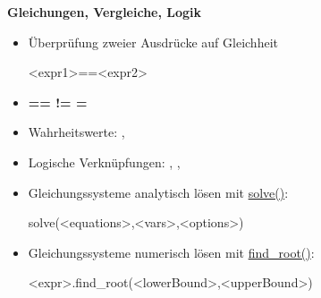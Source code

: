 \documentclass[a4paper,9pt,DIV15,twocolumn]{scrartcl}
\begin{document}
\textbf{Gleichungen, Vergleiche, Logik}

\begin{itemize}
	\item \"Uberpr\"ufung zweier Ausdr\"ucke auf Gleichheit
		\begin{sagein}
<expr1>==<expr2>
		\end{sagein}
	\item \textbf{ == != =}
 \item Wahrheitswerte: , 
 \item Logische Verknüpfungen: , , 
 \item Gleichungssysteme analytisch lösen mit \href{https://sage.math.uni-goettingen.de/doc/static/reference/sage/symbolic/relation.html?highlight=symbolic.relation#sage.symbolic.relation.solve}{solve()}:
\begin{sagein}
 solve(<equations>,<vars>,<options>)
\end{sagein}
\item Gleichungssysteme numerisch lösen mit \href{https://sage.math.uni-goettingen.de/doc/static/reference/sage/numerical/optimize.html?highlight=numerical.optimize#sage.numerical.optimize.find_root}{find\_root()}:
    \begin{sagein}
<expr>.find_root(<lowerBound>,<upperBound>)
    \end{sagein}


\end{itemize}
\end{document}
